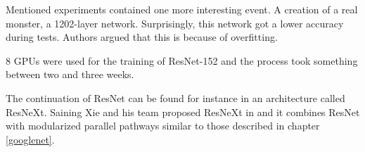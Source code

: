 Mentioned experiments contained one more interesting event. A creation of a real monster, a 1202-layer network. Surprisingly, this network got a lower accuracy during tests. Authors argued that this is because of overfitting.

8 GPUs were used for the training of ResNet-152 and the process took something between two and three weeks.

The continuation of ResNet can be found for instance in an architecture called ResNeXt. Saining Xie and his team proposed ResNeXt in \cite{resnext} and it combines ResNet with modularized parallel pathways similar to those described in chapter \ref{googlenet}.


